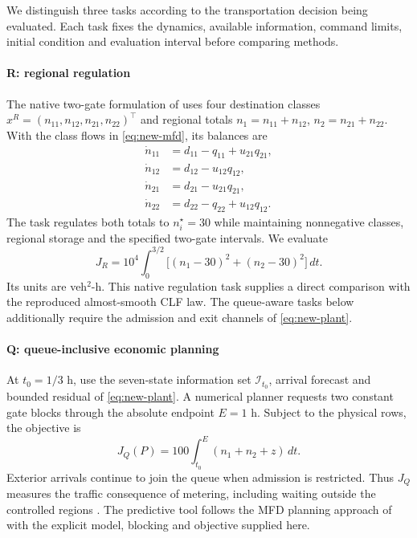 \documentclass[journal,10pt]{IEEEtran}
\begin{document}
We distinguish three tasks according to the transportation decision being
evaluated. Each task fixes the dynamics, available information, command limits,
initial condition and evaluation interval before comparing methods.

\paragraph{R: regional regulation}
The native two-gate formulation of \cite{zhong2018robust} uses four
destination classes $x^R=(n_{11},n_{12},n_{21},n_{22})^\top$ and regional
totals $n_1=n_{11}+n_{12}$, $n_2=n_{21}+n_{22}$. With the class flows in
\eqref{eq:new-mfd}, its balances are
\begin{equation}
\begin{aligned}
\dot n_{11}&=d_{11}-q_{11}+u_{21}q_{21},\\
\dot n_{12}&=d_{12}-u_{12}q_{12},\\
\dot n_{21}&=d_{21}-u_{21}q_{21},\\
\dot n_{22}&=d_{22}-q_{22}+u_{12}q_{12}.
\end{aligned}
\label{eq:benchmark-native}
\end{equation}
The task regulates both totals to $n_i^\star=30$ while maintaining
nonnegative classes, regional storage and the specified two-gate intervals.
We evaluate
\begin{equation}
J_R=10^4\int_0^{3/2}\bigl[(n_1-30)^2+(n_2-30)^2\bigr]\,dt.
\label{eq:benchmark-regulation-cost}
\end{equation}
Its units are veh$^2$-h. This native regulation task supplies a direct
comparison with the reproduced almost-smooth CLF law. The queue-aware tasks
below additionally require the admission and exit channels of
\eqref{eq:new-plant}.

\paragraph{Q: queue-inclusive economic planning}
At $t_0=1/3$ h, use the seven-state information set $\mathcal I_{t_0}$,
arrival forecast and bounded residual of \eqref{eq:new-plant}. A numerical
planner requests two constant gate blocks through the absolute endpoint
$E=1$ h. Subject to the physical rows, the objective is
\begin{equation}
J_Q(P)=100\int_{t_0}^{E}(n_1+n_2+z)\,dt.
\label{eq:benchmark-queue-cost}
\end{equation}
Exterior arrivals continue to join the queue when admission is restricted.
Thus $J_Q$ measures the traffic consequence of metering, including waiting
outside the controlled regions \cite{haddad2017queues}. The predictive tool
follows the MFD planning approach of \cite{geroliminis2013mpc} with the
explicit model, blocking and objective supplied here.
\end{document}
